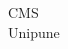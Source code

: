 \documentclass{article}
\begin{document}
\begin{center}
{\Huge CMS}
{\\Unipune}
\end{center}
\end{document}
